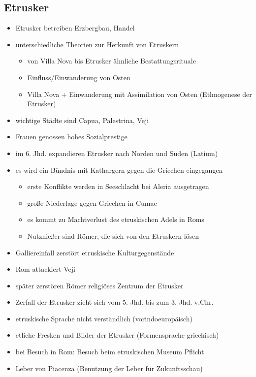 \documentclass[10pt,a4paper,oneside,ngerman,numbers=noenddot]{scrartcl}
\newenvironment{myitemize}{\begin{itemize}\itemsep -9pt}{\end{itemize}} %
\begin{document}
\subsection*{Etrusker}

\begin{myitemize}
    \item Etrusker betreiben Erzbergbau, Handel
    \item unterschiedliche Theorien zur Herkunft von Etruskern
    \begin{myitemize}
        \item von Villa Nova bis Etrusker ähnliche Bestattungsrituale
        \item Einfluss/Einwanderung von Osten
        \item Villa Nova + Einwanderung mit Assimilation von Osten (Ethnogenese der Etrusker)
    \end{myitemize}
    \item wichtige Städte sind Capua, Palestrina, Veji
    \item Frauen genossen hohes Sozialprestige
    \item im 6. Jhd. expandieren Etrusker nach Norden und Süden (Latium)
    \item es wird ein Bündnis mit Kathargern gegen die Griechen eingegangen
    \begin{myitemize}
        \item erste Konflikte werden in Seeschlacht bei Aleria ausgetragen
        \item große Niederlage gegen Griechen in Cumae
        \item es kommt zu Machtverlust des etruskischen Adels in Roms
        \item Nutznießer sind Römer, die sich von den Etruskern lösen
    \end{myitemize}
    \item Galliereinfall zerstört etruskische Kulturgegenstände
    \item Rom attackiert Veji
    \item später zerstören Römer religiöses Zentrum der Etrusker
    \item Zerfall der Etrusker zieht sich vom 5. Jhd. bis zum 3. Jhd. v.Chr.
    \item etruskische Sprache nicht verständlich (vorindoeuropäisch)
    \item etliche Fresken und Bilder der Etrusker (Formensprache griechisch)
    \item bei Besuch in Rom: Besuch beim etruskischen Museum Pflicht
    \item Leber von Piacenza (Benutzung der Leber für Zukunftsschau)
\end{myitemize}
\end{document}
